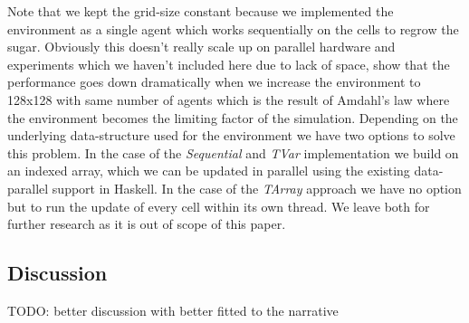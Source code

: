 Note that we kept the grid-size constant because we implemented the environment as a single agent which works sequentially on the cells to regrow the sugar. Obviously this doesn't really scale up on parallel hardware and experiments which we haven't included here due to lack of space, show that the performance goes down dramatically when we increase the environment to 128x128 with same number of agents which is the result of Amdahl's law where the environment becomes the limiting factor of the simulation. Depending on the underlying data-structure used for the environment we have two options to solve this problem. In the case of the \textit{Sequential} and \textit{TVar} implementation we build on an indexed array, which we can be updated in parallel using the existing data-parallel support in Haskell. In the case of the \textit{TArray} approach we have no option but to run the update of every cell within its own thread. We leave both for further research as it is out of scope of this paper.

\subsection{Discussion}
TODO: better discussion with better fitted to the narrative

